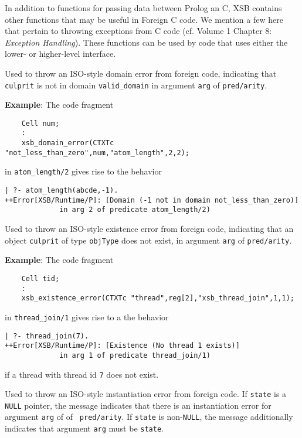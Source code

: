 In addition to functions for passing data between Prolog an C, XSB
contains other functions that may be useful in Foreign C code.  We
mention a few here that pertain to throwing exceptions from C code
(cf. Volume 1 Chapter 8: {\em Exception Handling}).  These functions
can be used by code that uses either the lower- or higher-level
interface.

\begin{description}
%
Used to throw an ISO-style domain error from foreign code, indicating
that {\tt culprit} is not in domain {\tt valid\_domain} in argument
{\tt arg} of {\tt pred/arity}.

{\bf Example}: The code fragment
%
\begin{verbatim}
    Cell num;
    : 
    xsb_domain_error(CTXTc "not_less_than_zero",num,"atom_length",2,2);
\end{verbatim}
in {\tt atom\_length/2} gives rise to the behavior
%
\begin{verbatim}
| ?- atom_length(abcde,-1).
++Error[XSB/Runtime/P]: [Domain (-1 not in domain not_less_than_zero)] 
             in arg 2 of predicate atom_length/2)
\end{verbatim}


%
Used to throw an ISO-style existence error from foreign code,
indicating that an object {\tt culprit} of type {\tt objType} does not
exist, in argument {\tt arg} of {\tt pred/arity}.

{\bf Example}: The code fragment
%
\begin{verbatim}
    Cell tid;
    :
    xsb_existence_error(CTXTc "thread",reg[2],"xsb_thread_join",1,1); 
\end{verbatim}
in {\tt thread\_join/1} gives rise to a the behavior
\begin{verbatim}
| ?- thread_join(7).
++Error[XSB/Runtime/P]: [Existence (No thread 1 exists)] 
             in arg 1 of predicate thread_join/1)
\end{verbatim}
if a thread with thread id {\tt 7} does not exist.


  
%
Used to throw an ISO-style instantiation error from foreign code.  If
{\tt state} is a {\tt NULL} pointer, the message indicates that there
is an instantiation error for argument {\tt arg} of of {\tt
  pred/arity}.  If {\tt state} is non-{\tt NULL}, the message
additionally indicates that argument {\tt arg} must be {\tt state}.


\end{description}

